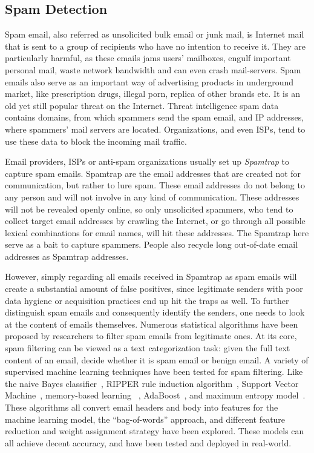 \subsection{Spam Detection}
Spam email, also referred as unsolicited bulk email or junk mail, is 
Internet mail that is sent to a group of recipients who have no intention 
to receive it. They are particularly harmful, as these emails jams users' 
mailboxes, engulf important personal mail, waste network bandwidth and 
can even crash mail-servers. Spam emails also serve as an important
way of advertising products in underground market, like prescription drugs, 
illegal porn, replica of other brands etc. It is an old yet still popular
threat on the Internet. Threat intelligence spam data contains domains, 
from which spammers send the spam email, and IP addresses, where spammers' 
mail servers are located. Organizations, and even ISPs, tend to use these 
data to block the incoming mail traffic.

Email providers, ISPs or anti-spam organizations usually set up 
\textit{Spamtrap} to capture spam emails. Spamtrap are the email addresses
that are created not for communication, but rather to lure spam. These
email addresses do not belong to any person and will not involve in any
kind of communication. These addresses will not be revealed openly online,
so only unsolicited spammers, who tend to collect target email addresses
by crawling the Internet, or go through all possible lexical combinations
for email names, will hit these addresses. The Spamtrap here serve as a 
bait to capture spammers. People also recycle long out-of-date email 
addresses as Spamtrap addresses. 

However, simply regarding all emails received in Spamtrap as spam emails 
will create a substantial amount of false positives, since legitimate 
senders with poor data hygiene or acquisition practices end up hit the traps 
as well. To further distinguish spam emails and consequently identify the
senders, one needs to look at the content of emails themselves. Numerous 
statistical algorithms have been proposed by researchers to filter spam
emails from legitimate ones. At its core, spam filtering can be viewed as
a text categorization task: given the full text content of an email, 
decide whether it is spam email or benign email. A variety of supervised
machine learning techniques have been tested for spam filtering. Like the
naive Bayes classifier~\cite{androutsopoulos2000evaluation, sahami1998bayesian, schneider2003comparison}, 
RIPPER rule induction algorithm~\cite{cohen1996learning},
Support Vector Machine~\cite{drucker1999support}, memory-based learning
~\cite{androutsopoulos2000learning}, AdaBoost~\cite{carreras2001boosting},
and maximum entropy model~\cite{zhang2003filtering}. These algorithms all
convert email headers and body into features for the machine learning model, 
the ``bag-of-words'' approach,
and different feature reduction and weight assignment strategy have been
explored. These models can all achieve decent accuracy, and have been tested
and deployed in real-world. 

